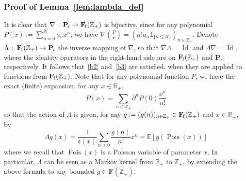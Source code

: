\documentclass[AHL,Unicode,longabstracts]{cedram}
\DeclareMathOperator{\Id}{Id}
\DeclareMathOperator{\Pois}{Pois}
\newcommand{\df}{\mathrel{:=}}
\newcommand{\EE}{\mathbb{E}}
\newcommand{\RR}{\mathbb{R}}
\newcommand{\ZZ}{\mathbb{Z}}
\newcommand{\fe}{\mathfrak{e}}
\newcommand{\na}{\nabla}
\newcommand{\pa}{\partial}
\newcommand{\ri}{\rightarrow}
\newcommand{\st}{\,:\,}
\newcommand{\un}{\mathds{1}}
\newcommand{\esP}{\mathbf{P}}
\newcommand{\esF}{\mathbf{F}}
\newcommand{\esPe}{\esP_{\! \fe}}
\newcommand{\esFf}{\esF_{\hskip-.3mm\mathrm{f}}}
\begin{document}
\subsubsection{Proof of Lemma~\ref{lem:lambda_def}}

It is clear that $\na\st \esPe\ri \esFf(\ZZ_+)$ is bijective, since for any polynomial $P(x)\df \sum_{n=0}^N a_nx^n$, we have $\na(\frac{P}{\mathfrak e})=(n! a_n \un_{\{ n\leq N\}})_{n\in \ZZ_+}$. Denote $\Lambda\st \esFf(\ZZ_+)\ri\esPe$ the inverse mapping of $\na$, so that $\na \Lambda=\Id$ and $\Lambda \na=\Id$, where the identity operators in the right-hand side are on $\esFf(\ZZ_+)$ and $\esPe$ respectively. It follows that~\eqref{b2} and~\eqref{b3} are satisfied, when they are applied to functions from $\esFf(\ZZ_+)$. Note that for any polynomial function $P$, we have the exact (finite) expansion, for any $ x\in \RR_+$,
\[
P(x)=\sum_{n\in\ZZ_+} \pa^n P(0)\frac{x^n}{n!}
\]
so that the action of $\Lambda$ is given, for any $ g\df(g(n))_{n\in\ZZ_+}\in\esFf(\ZZ_+)$ and $ x\in\RR_+,$ by
\[
\Lambda g(x)=\frac{1}{\fe(x)}\sum_{n\geq 0} \frac{g(n)}{n!} x^n =\EE[g(\Pois(x))]
\]
where we recall that $\Pois(x)$ is a Poisson variable of parameter $x$. In particular, $\Lambda$ can be seen as a Markov kernel from $\RR_+$ to $\ZZ_+$, by extending the above formula to any bounded $g\in\esF(\ZZ_+)$.
\end{document}
